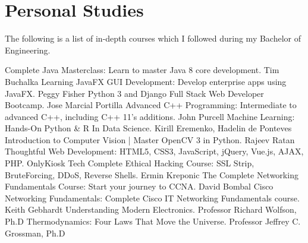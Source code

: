 \documentclass[]{friggeri-cv} %
\begin{document}
\section{Personal Studies}
\vspace{-3mm}
The following is a list of in-depth courses which I followed during my Bachelor of Engineering.

\begin{entrylist}
\entry
{}
{Complete Java Masterclass: {\normalfont\small{Learn to master Java 8 core development.}}}
{Tim Buchalka}
{\vspace{-3mm}}
\entry
{}
{Learning JavaFX GUI Development: {\normalfont\small{Develop enterprise apps using JavaFX.}}}
{Peggy Fisher}
{\vspace{-3mm}}
\entry
{}
{Python 3 and Django Full Stack Web Developer Bootcamp{\normalfont\small{.}}}
{Jose Marcial Portilla}
{\vspace{-3mm}}
\entry
{}
{Advanced C++ Programming: {\normalfont\small{Intermediate to advanced C++, including C++ 11's additions.}}}
{John Purcell}
{\vspace{-3mm}}
\entry
{}
{Machine Learning: Hands-On Python \& R In Data Science{\normalfont\small{.}}}
{Kirill Eremenko, Hadelin de Ponteves}
{\vspace{-3mm}}
\entry
{}
{Introduction to Computer Vision | Master OpenCV 3 in Python{\normalfont\small{.}}}
{Rajeev Ratan}
{\vspace{-3mm}}
\entry
{}
{Thoughtful Web Development: {\normalfont\small{HTML5, CSS3, JavaScript, jQuery, Vue.js, AJAX, PHP.}}}
{OnlyKiosk Tech}
{\vspace{-3mm}}
\entry
{}
{Complete Ethical Hacking Course: {\normalfont\small{SSL Strip, BruteForcing, DDoS, Reverse Shells.}}}
{Ermin Kreponic}
{\vspace{-3mm}}
\entry
{}
{The Complete Networking Fundamentals Course: {\normalfont\small{Start your journey to CCNA.}}}
{David Bombal}
{\vspace{-3mm}}
\entry
{}
{Cisco Networking Fundamentals: {\normalfont\small{Complete Cisco IT Networking Fundamentals course.}}}
{Keith Gebhardt}
{\vspace{-3mm}}
\entry
{}
{Understanding Modern Electronics{\normalfont\small{.}}}
{Professor Richard Wolfson, Ph.D}
{\vspace{-3mm}}
\entry
{}
{Thermodynamics: Four Laws That Move the Universe{\normalfont\small{.}}}
{Professor Jeffrey C. Grossman, Ph.D}
{\vspace{-3mm}}
\end{entrylist}
\end{document}

